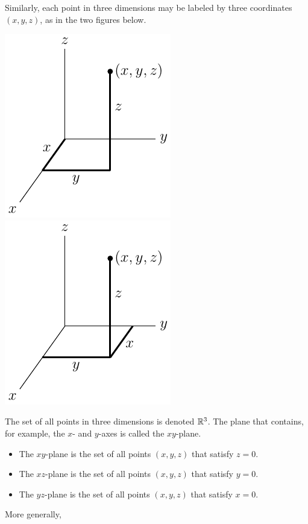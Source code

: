 Similarly, each point in three dimensions may be labeled by 
three coordinates $(x,y,z)$, as in the two figures below.
\begin{efig}
\begin{center}
   \includegraphics{point3d.pdf}\qquad
   \includegraphics{point3db.pdf}
\end{center}
\end{efig}
The set of all points in three dimensions is denoted $\mathbb{R}^3$.
The plane that contains, for example, the $x$- and $y$-axes
is called the $xy$-plane.
\begin{itemize}\itemsep1pt \parskip0pt 
\item The $xy$-plane is the set of all points $(x,y,z)$ that
satisfy $z=0$.
\item The $xz$-plane is the set of all points $(x,y,z)$ that
satisfy $y=0$.
\item The $yz$-plane is the set of all points $(x,y,z)$ that
satisfy $x=0$.
\end{itemize}
More generally,
